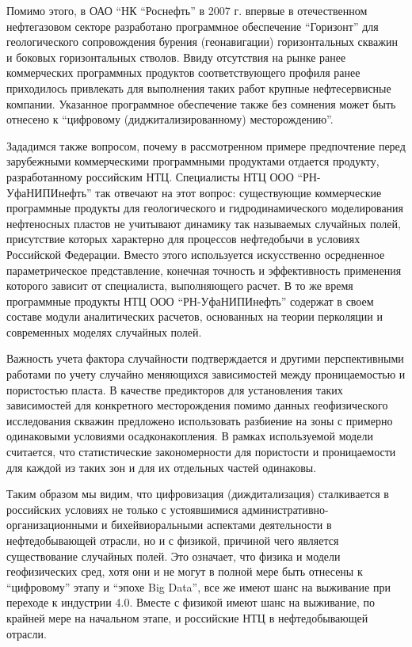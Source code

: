 Помимо этого, в ОАО ``НК ``Роснефть'' в 2007 г. впервые в отечественном нефтегазовом секторе разработано программное обеспечение ``Горизонт'' для геологического сопровождения бурения (геонавигации) горизонтальных скважин и боковых горизонтальных стволов.
Ввиду отсутствия на рынке ранее коммерческих программных продуктов соответствующего профиля ранее приходилось привлекать для выполнения таких работ крупные нефтесервисные компании.
Указанное программное обеспечение также без сомнения может быть отнесено к ``цифровому (диджитализированному) месторождению''.

Зададимся также вопросом, почему в рассмотренном примере предпочтение перед зарубежными коммерческими программными продуктами отдается продукту, разработанному российским НТЦ.
Специалисты НТЦ ООО ``РН-УфаНИПИнефть'' так отвечают на этот вопрос: существующие коммерческие программные продукты для геологического и гидродинамического моделирования нефтеносных пластов не учитывают динамику так называемых случайных полей, присутствие которых характерно для процессов нефтедобычи в условиях Российской Федерации.
Вместо этого используется искусственно осредненное параметрическое представление, конечная точность и эффективность применения которого зависит от специалиста, выполняющего расчет.
В то же время программные продукты НТЦ ООО ``РН-УфаНИПИнефть'' содержат в своем составе модули аналитических расчетов, основанных на теории перколяции и современных моделях случайных полей.

Важность учета фактора случайности подтверждается и другими перспективными работами по учету случайно меняющихся зависимостей между проницаемостью и пористостью пласта.
В качестве предикторов для установления таких зависимостей для конкретного месторождения помимо данных геофизического исследования скважин предложено использовать разбиение на зоны с примерно одинаковыми условиями осадконакопления.
В рамках используемой модели считается, что статистические закономерности для пористости и проницаемости для каждой из таких зон и для их отдельных частей одинаковы.

Таким образом мы видим, что цифровизация (диждитализация) сталкивается в российских условиях не только с устоявшимися административно-организационными и бихейвиоральными аспектами деятельности в нефтедобывающей отрасли, но и с физикой, причиной чего является существование случайных полей.
Это означает, что физика и модели геофизических сред, хотя они и не могут в полной мере быть отнесены к ``цифровому'' этапу и ``эпохе Big Data'', все же имеют шанс на выживание при переходе к индустрии 4.0.
Вместе с физикой имеют шанс на выживание, по крайней мере на начальном этапе, и российские НТЦ в нефтедобывающей отрасли.

